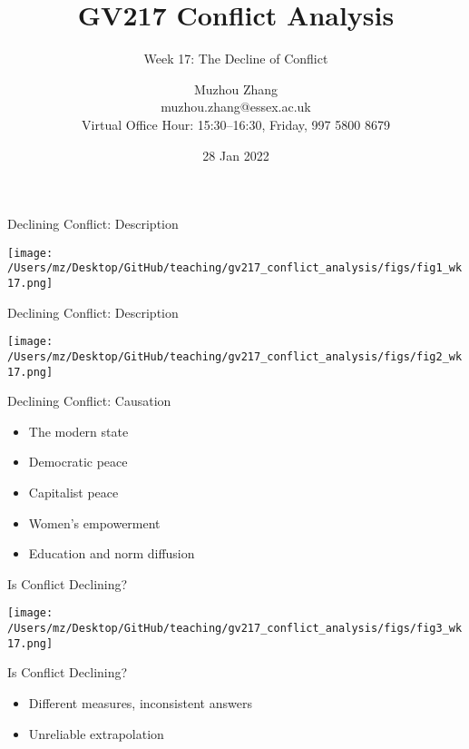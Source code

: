 \documentclass{beamer}
\title{GV217 Conflict Analysis}
\subtitle{Week 17: The Decline of Conflict}
\author{Muzhou Zhang\\ muzhou.zhang@essex.ac.uk\\ Virtual Office Hour: 15:30--16:30, Friday, 997 5800 8679}
\date{28 Jan 2022}
\begin{document}
\maketitle
{}

\begin{frame}{Declining Conflict: Description}
    \pause
    \begin{center}
        \texttt{[image: /Users/mz/Desktop/GitHub/teaching/gv217\_conflict\_analysis/figs/fig1\_wk17.png]}
    \end{center}
\end{frame}

\begin{frame}{Declining Conflict: Description}
    \pause
    \begin{center}
        \texttt{[image: /Users/mz/Desktop/GitHub/teaching/gv217\_conflict\_analysis/figs/fig2\_wk17.png]}
    \end{center}
\end{frame}

\begin{frame}{Declining Conflict: Causation}
    \begin{itemize}
        \pause\item The modern state
        \pause\item Democratic peace
        \pause\item Capitalist peace
        \pause\item Women's empowerment
        \pause\item Education and norm diffusion
    \end{itemize}
\end{frame}

\begin{frame}{Is Conflict Declining?}
    \pause
    \begin{center}
        \texttt{[image: /Users/mz/Desktop/GitHub/teaching/gv217\_conflict\_analysis/figs/fig3\_wk17.png]}
    \end{center}
\end{frame}

\begin{frame}{Is Conflict Declining?}
    \begin{itemize}
        \pause\item Different measures, inconsistent answers
        \pause\item Unreliable extrapolation
    \end{itemize}
\end{frame}
\end{document}
